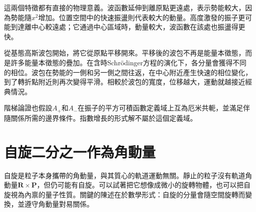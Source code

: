 這兩個特徵都有直接的物理意義。波函數延伸到離原點更遠處，表示勢能較大，因為勢能隨\(x^{2}\)增加。位置空間中的快速振盪則代表較大的動量。高度激發的振子更可能到達離中心較遠處；它通過中心區域時，動量較大，波函數在該處也振盪得更快。

\begin{classroomqa}
\end{classroomqa}

從基態高斯波包開始，將它從原點平移開來。平移後的波包不再是能量本徵態，而是許多能量本徵態的疊加。在含時Schr\"odinger方程的演化下，各分量會獲得不同的相位。波包在勢能的一側和另一側之間往返，在中心附近產生快速的相位變化，到了轉折點附近則再次變得平滑。相較於波包的寬度，位移越大，運動就越接近經典情況。

\begin{classroomqa}
\end{classroomqa}

階梯論證也假設\(A_{+}\)和\(A_{-}\)在振子的平方可積函數定義域上互為厄米共軛，並滿足伴隨關係所需的邊界條件。指數增長的形式解不屬於這個定義域。

\begin{classroomqa}
\end{classroomqa}

\section{自旋二分之一作為角動量}

自旋是粒子本身攜帶的角動量，與其質心的軌道運動無關。靜止的粒子沒有軌道角動量\(\mathbf R\times\mathbf P\)，但仍可能有自旋。可以試著把它想像成微小的旋轉物體，也可以把自旋視為內禀的量子性質。關鍵的陳述在於數學形式：自旋的分量會隨空間旋轉而變換，並遵守角動量對易關係。

